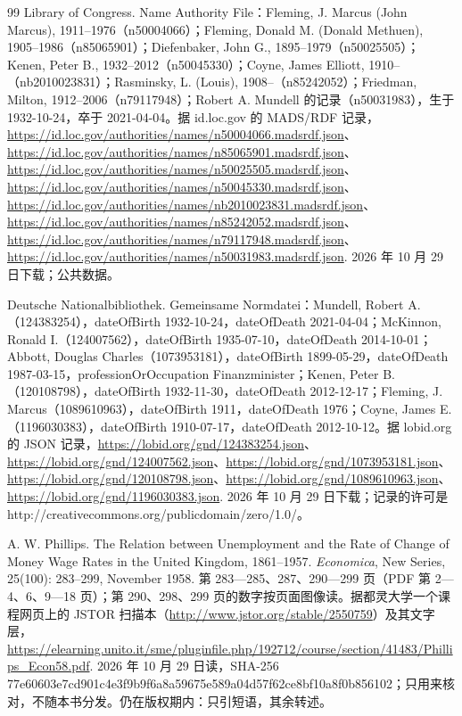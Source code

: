 \begin{thebibliography}{99}
 Library of Congress. Name Authority File：Fleming, J. Marcus (John Marcus), 1911--1976（n50004066）；Fleming, Donald M. (Donald Methuen), 1905--1986（n85065901）；Diefenbaker, John G., 1895--1979（n50025505）；Kenen, Peter B., 1932--2012（n50045330）；Coyne, James Elliott, 1910--（nb2010023831）；Rasminsky, L. (Louis), 1908--（n85242052）；Friedman, Milton, 1912--2006（n79117948）；Robert A. Mundell 的记录（n50031983），生于 1932-10-24，卒于 2021-04-04。据 id.loc.gov 的 MADS/RDF 记录，\url{https://id.loc.gov/authorities/names/n50004066.madsrdf.json}、\url{https://id.loc.gov/authorities/names/n85065901.madsrdf.json}、\url{https://id.loc.gov/authorities/names/n50025505.madsrdf.json}、\url{https://id.loc.gov/authorities/names/n50045330.madsrdf.json}、\url{https://id.loc.gov/authorities/names/nb2010023831.madsrdf.json}、\url{https://id.loc.gov/authorities/names/n85242052.madsrdf.json}、\url{https://id.loc.gov/authorities/names/n79117948.madsrdf.json}、\url{https://id.loc.gov/authorities/names/n50031983.madsrdf.json}. 2026 年 10 月 29 日下载；公共数据。

 Deutsche Nationalbibliothek. Gemeinsame Normdatei：Mundell, Robert A.（124383254），dateOfBirth 1932-10-24，dateOfDeath 2021-04-04；McKinnon, Ronald I.（124007562），dateOfBirth 1935-07-10，dateOfDeath 2014-10-01；Abbott, Douglas Charles（1073953181），dateOfBirth 1899-05-29，dateOfDeath 1987-03-15，professionOrOccupation Finanzminister；Kenen, Peter B.（120108798），dateOfBirth 1932-11-30，dateOfDeath 2012-12-17；Fleming, J. Marcus（1089610963），dateOfBirth 1911，dateOfDeath 1976；Coyne, James E.（1196030383），dateOfBirth 1910-07-17，dateOfDeath 2012-10-12。据 lobid.org 的 JSON 记录，\url{https://lobid.org/gnd/124383254.json}、\url{https://lobid.org/gnd/124007562.json}、\url{https://lobid.org/gnd/1073953181.json}、\url{https://lobid.org/gnd/120108798.json}、\url{https://lobid.org/gnd/1089610963.json}、\url{https://lobid.org/gnd/1196030383.json}. 2026 年 10 月 29 日下载；记录的许可是 http://creativecommons.org/publicdomain/zero/1.0/。

 A. W. Phillips. The Relation between Unemployment and the Rate of Change of Money Wage Rates in the United Kingdom, 1861--1957. \emph{Economica}, New Series, 25(100): 283--299, November 1958. 第 283—285、287、290—299 页（PDF 第 2—4、6、9—18 页）；第 290、298、299 页的数字按页面图像读。据都灵大学一个课程网页上的 JSTOR 扫描本（\url{http://www.jstor.org/stable/2550759}）及其文字层，\url{https://elearning.unito.it/sme/pluginfile.php/192712/course/section/41483/Phillips_Econ58.pdf}. 2026 年 10 月 29 日读，SHA-256 77e60603e7cd901c4e3f9b9f6a8a59675e589a04d57f62ce8bf10a8f0b856102；只用来核对，不随本书分发。仍在版权期内：只引短语，其余转述。


\end{thebibliography}
